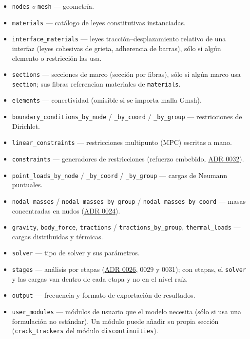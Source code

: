 \documentclass[11pt,oneside]{report}
\begin{document}
\begin{itemize}
  \item \texttt{nodes} \textit{o} \texttt{mesh} --- geometría.
  \item \texttt{materials} --- catálogo de leyes constitutivas instanciadas.
  \item \texttt{interface\_\allowbreak{}materials} --- leyes tracción--desplazamiento relativo de una interfaz (leyes cohesivas de grieta, adherencia de barras), sólo si algún elemento o restricción las usa.
  \item \texttt{sections} --- secciones de marco (sección por fibras), sólo si algún marco usa \texttt{section}; sus fibras referencian materiales de \texttt{materials}.
  \item \texttt{elements} --- conectividad (omisible si se importa malla Gmsh).
  \item \texttt{boundary\_\allowbreak{}conditions\_\allowbreak{}by\_\allowbreak{}node} / \texttt{\_by\_coord} / \texttt{\_by\_group} --- restricciones de Dirichlet.
  \item \texttt{linear\_\allowbreak{}constraints} --- restricciones multipunto (MPC) escritas a mano.
  \item \texttt{constraints} --- generadores de restricciones (refuerzo embebido, \href{https://github.com/jretamav/solidum-fem/blob/main/docs/adr/0032-restricciones-generadas-y-refuerzo-embebido.md}{ADR 0032}).
  \item \texttt{point\_\allowbreak{}loads\_\allowbreak{}by\_\allowbreak{}node} / \texttt{\_by\_coord} / \texttt{\_by\_group} --- cargas de Neumann puntuales.
  \item \texttt{nodal\_masses} / \texttt{nodal\_\allowbreak{}masses\_\allowbreak{}by\_\allowbreak{}group} / \texttt{nodal\_\allowbreak{}masses\_\allowbreak{}by\_\allowbreak{}coord} --- masas concentradas en nudos (\href{https://github.com/jretamav/solidum-fem/blob/main/docs/adr/0024-masas-de-nudo-y-modal-con-dof-sin-masa.md}{ADR 0024}).
  \item \texttt{gravity}, \texttt{body\_force}, \texttt{tractions} / \texttt{tractions\_\allowbreak{}by\_\allowbreak{}group}, \texttt{thermal\_loads} --- cargas distribuidas y térmicas.
  \item \texttt{solver} --- tipo de solver y sus parámetros.
  \item \texttt{stages} --- análisis por etapas (\href{https://github.com/jretamav/solidum-fem/blob/main/docs/adr/0026-etapas-de-carga-en-los-solvers-estaticos.md}{ADR 0026}, 0029 y 0031); con etapas, el \texttt{solver} y las cargas van dentro de cada etapa y no en el nivel raíz.
  \item \texttt{output} --- frecuencia y formato de exportación de resultados.
  \item \texttt{user\_modules} --- módulos de usuario que el modelo necesita (sólo si usa una formulación no estándar). Un módulo puede añadir su propia sección (\texttt{crack\_trackers} del módulo \texttt{discontinuities}).
\end{itemize}
\end{document}
